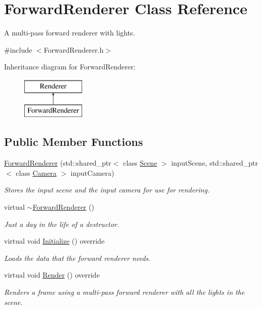 \hypertarget{class_forward_renderer}{}\section{Forward\+Renderer Class Reference}
\label{class_forward_renderer}


A multi-\/pass forward renderer with lights.  




{\ttfamily \#include $<$Forward\+Renderer.\+h$>$}

Inheritance diagram for Forward\+Renderer\+:\begin{figure}[H]
\begin{center}
\leavevmode
\includegraphics[height=2.000000cm]{class_forward_renderer}
\end{center}
\end{figure}
\subsection*{Public Member Functions}
\begin{DoxyCompactItemize}
\item 
\hyperlink{class_forward_renderer_af8ed84e45085c4dc60d565fcc3c198d1}{Forward\+Renderer} (std\+::shared\+\_\+ptr$<$ class \hyperlink{class_scene}{Scene} $>$ input\+Scene, std\+::shared\+\_\+ptr$<$ class \hyperlink{class_camera}{Camera} $>$ input\+Camera)
\begin{DoxyCompactList}\small\item\em Stores the input scene and the input camera for use for rendering. \end{DoxyCompactList}\item 
virtual \hyperlink{class_forward_renderer_ab27ea6139730631d79488cec3c564597}{$\sim$\+Forward\+Renderer} ()
\begin{DoxyCompactList}\small\item\em Just a day in the life of a destructor. \end{DoxyCompactList}\item 
virtual void \hyperlink{class_forward_renderer_a5cbca647822780d6cfbd39552d73ee06}{Initialize} () override
\begin{DoxyCompactList}\small\item\em Loads the data that the forward renderer needs. \end{DoxyCompactList}\item 
virtual void \hyperlink{class_forward_renderer_a1a5deafa5deaf1e0abaab0e2074928c1}{Render} () override
\begin{DoxyCompactList}\small\item\em Renders a frame using a multi-\/pass forward renderer with all the lights in the scene. \end{DoxyCompactList}\end{DoxyCompactItemize}
